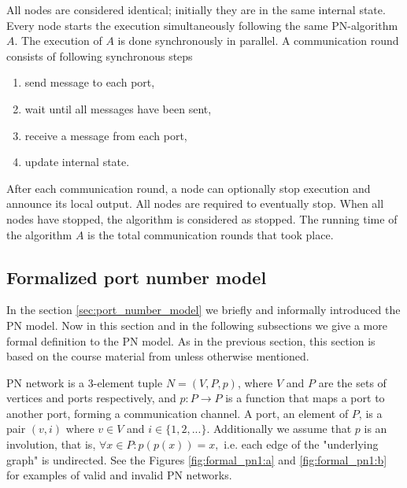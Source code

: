 All nodes are considered identical; initially they are in the same internal state.
Every node starts the execution simultaneously following the same PN-algorithm $A$.
The execution of $A$ is done synchronously in parallel.
A communication round consists of following synchronous steps
\begin{enumerate}
  \item send message to each port,
  \item wait until all messages have been sent,
  \item receive a message from each port,
  \item update internal state.
\end{enumerate}
After each communication round, a node can optionally stop execution and announce its local output.
All nodes are required to eventually stop.
When all nodes have stopped, the algorithm is considered as stopped.
The running time of the algorithm $A$ is the total communication rounds that took place.


\subsection{Formalized port number model}
In the section \ref{sec:port_number_model} we briefly and informally introduced the PN model.
Now in this section and in the following subsections we give a more formal definition to the PN model.
As in the previous section, this section is based on the course material from \cite{HirvonenSuomelaDistAlg2020} unless otherwise mentioned.

PN network is a 3-element tuple $N = (V, P, p)$, where $V$ and $P$ are the sets of vertices and ports respectively, and $p: P \rightarrow P$ is a function that maps a port to another port, forming a communication channel.
A port, an element of $P$, is a pair $(v, i)$ where $v \in V$ and $i \in \{1, 2, ...\}$.
Additionally we assume that $p$ is an involution, that is, $\forall x \in P : p(p(x)) = x, $ i.e. each edge of the "underlying graph" is undirected.
See the Figures \ref{fig:formal_pn1:a} and \ref{fig:formal_pn1:b} for examples of valid and invalid PN networks.

